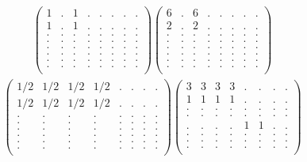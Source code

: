 \documentclass[12pt,a4paper]{amsart}
\begin{document}
\begin{align*}
\left(\begin{array}{rrrrrrrr}%
1&.&1&.&.&.&.&.\\%
1&.&1&.&.&.&.&.\\%
.&.&.&.&.&.&.&.\\%
.&.&.&.&.&.&.&.\\%
.&.&.&.&.&.&.&.\\%
.&.&.&.&.&.&.&.\\%
.&.&.&.&.&.&.&.\\%
.&.&.&.&.&.&.&.\\%
\end{array}\right)%
\left(\begin{array}{rrrrrrrr}%
6&.&6&.&.&.&.&.\\%
2&.&2&.&.&.&.&.\\%
.&.&.&.&.&.&.&.\\%
.&.&.&.&.&.&.&.\\%
.&.&.&.&.&.&.&.\\%
.&.&.&.&.&.&.&.\\%
.&.&.&.&.&.&.&.\\%
.&.&.&.&.&.&.&.\\%
\end{array}\right)%
\end{align*}
\begin{align*}
\left(\begin{array}{rrrrrrrr}%
1/2&1/2&1/2&1/2&.&.&.&.\\%
1/2&1/2&1/2&1/2&.&.&.&.\\%
.&.&.&.&.&.&.&.\\%
.&.&.&.&.&.&.&.\\%
.&.&.&.&.&.&.&.\\%
.&.&.&.&.&.&.&.\\%
.&.&.&.&.&.&.&.\\%
.&.&.&.&.&.&.&.\\%
\end{array}\right)%
\left(\begin{array}{rrrrrrrr}%
3&3&3&3&.&.&.&.\\%
1&1&1&1&.&.&.&.\\%
.&.&.&.&.&.&.&.\\%
.&.&.&.&.&.&.&.\\%
.&.&.&.&1&1&.&.\\%
.&.&.&.&.&.&.&.\\%
.&.&.&.&.&.&.&.\\%
.&.&.&.&.&.&.&.\\%
\end{array}\right)%
\end{align*}
\end{document}

